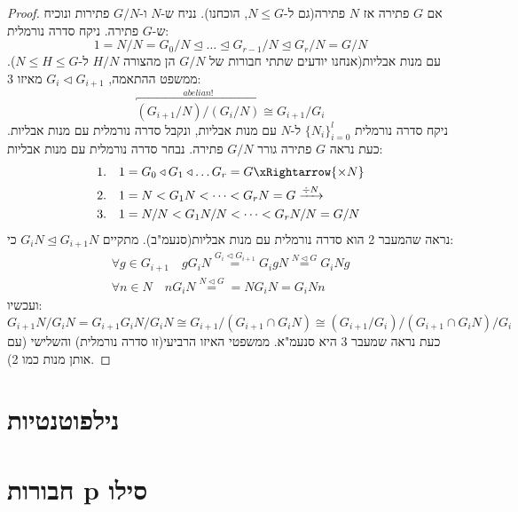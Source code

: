 \documentclass{tstextbook}
\begin{document}
\begin{proof}
אם \(G\) פתירה אז \(N\) פתירה(גם ל-\(N\leq G\), הוכחנו). נניח ש-\(N\) ו-\(G / N\) פתירות ונוכיח ש-\(G\) פתירה. ניקח סדרה נורמלית:
$$1=N / N = G_{0} / N \trianglelefteq  \dots \trianglelefteq G_{r-1} / N \trianglelefteq  G_{r} / N = G / N$$
עם מנות אבליות(אנחנו יודעים שתתי חבורות של \(G / N\) הן מהצורה \(H / N\) ל-\(N\leq H\leq G\)). ממשפט ההתאמה, \(G_{i}\triangleleft G_{i+1}\) מאיזו 3:
$$\overbracket{ (G_{i+1} / N) / (G_{i} / N) }^{ abelian! } \cong G_{i+1} / G_{i}$$
ניקח סדרה נורמלית \(\{ N_{i} \}_{i=0}^l\) ל-\(N\) עם מנות אבליות, ונקבל סדרה נורמלית עם מנות אבליות. כעת נראה \(G\) פתירה גורר \(G / N\) פתירה. נבחר סדרה
נורמלית עם מנות אבליות: 
$$\begin{aligned}1.\quad &1=G_{0}\triangleleft G_{1} \triangleleft \dots G_{r}= G \xRightarrow{\times N}\\2.\quad &1=N<G_{1}N<\dots <G_{r}N=G \xrightarrow{ \div N} \\3.\quad &1=N / N < G_{1} N / N<\dots < G_{r}N / N = G / N
\end{aligned}$$
נראה שהמעבר 2 הוא סדרה נורמלית עם מנות אבליות(סנעמ"ב). מתקיים \(G_{i}N\trianglelefteq G_{i+1}N\) כי: 
$$\begin{gathered}\forall g \in  G_{i+1}\quad  gG_{i}N\stackrel{G_{i} \triangleleft G_{i+1}}{=} G_{i}gN\stackrel{N\triangleleft G}{=} G_{i}Ng \\\forall n \in N\quad nG_{i}N \stackrel{N\triangleleft G}{=} = NG_{i}N = G_{i}Nn
\end{gathered}$$
ועכשיו:
$$G_{i+1}N / G_{i}N= G_{i+1 }G_{i}N / G_{i}N \cong G_{i+1} /\left(  G_{i+1}\cap G_{i}N \right) \cong (G_{i+1} / G_{i}) / \left( G_{i+1} \cap G_{i}N \right) / G_{i}$$
כעת נראה שמעבר 3 היא סנעמ"א. ממשפטי האיזו הרביעי(זו סדרה נורמלית) והשלישי (עם אותן מנות כמו 2).

\end{proof}
\section{נילפוטנטיות}


\section{חבורות p סילו}
\end{document}
